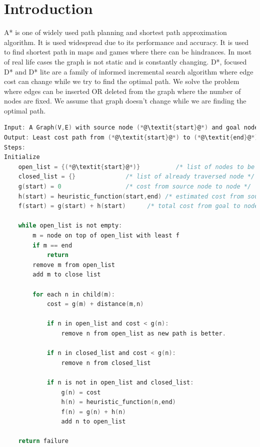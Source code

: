 \documentclass[a4paper]{article}
\begin{document}
\section{Introduction}
A*\cite{A*}\cite{Wiki A*} is one of widely used path planning and shortest path approximation algorithm. It is used widespread due to its performance and accuracy. It is used to find shortest path in maps and games where there can be hindrances. In most of real life cases the graph is not static and is constantly changing. D*\cite{original D*}, focused D*\cite{focused D*} and D* lite\cite{D* Lite} are a family of informed incremental search algorithm where edge cost can change while we try to find the optimal path. We solve the problem where edges can be inserted OR deleted from the graph where the number of nodes are fixed. We assume that graph doesn't change while we are finding the optimal path.
\begin{lstlisting}[language=C , caption=A*\cite{A*} ]
Input: A Graph(V,E) with source node (*@\textit{start}@*) and goal node (*@\textit{end}@*).
Output: Least cost path from (*@\textit{start}@*) to (*@\textit{end}@*).
Steps:
Initialize 
    open_list = {(*@\textit{start}@*)}          /* list of nodes to be traversed */
    closed_list = {}              /* list of already traversed node */
    g(start) = 0                  /* cost from source node to node */
    h(start) = heuristic_function(start,end) /* estimated cost from source to goal node */
    f(start) = g(start) + h(start)      /* total cost from goal to node */
    
    while open_list is not empty:
        m = node on top of open_list with least f
        if m == end
            return
        remove m from open_list
        add m to close list
        
        for each n in child(m):
            cost = g(m) + distance(m,n)
            
            if n in open_list and cost < g(n):
                remove n from open_list as new path is better.
                
            if n in closed_list and cost < g(n):
                remove n from closed_list
                
            if n is not in open_list and closed_list:
                g(n) = cost
                h(n) = heuristic_function(n,end)
                f(n) = g(n) + h(n)
                add n to open_list
    
    return failure
    
\end{lstlisting}
\end{document}
